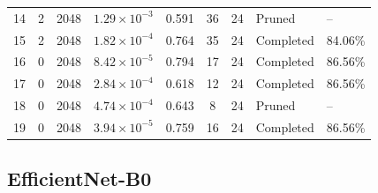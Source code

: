 {\begin{longtable}{lccccccll}
14 & 2 & 2048 & $1.29\times10^{-3}$ & 0.591 & 36 & 24 & Pruned & -- \\
15 & 2 & 2048 & $1.82\times10^{-4}$ & 0.764 & 35 & 24 & Completed & 84.06\% \\
\rowcolor{gray!15} 16 & 0 & 2048 & $8.42\times10^{-5}$ & 0.794 & 17 & 24 & Completed & 86.56\% \\
17 & 0 & 2048 & $2.84\times10^{-4}$ & 0.618 & 12 & 24 & Completed & 86.56\% \\
18 & 0 & 2048 & $4.74\times10^{-4}$ & 0.643 & 8 & 24 & Pruned & -- \\
19 & 0 & 2048 & $3.94\times10^{-5}$ & 0.759 & 16 & 24 & Completed & 86.56\% \\
\end{longtable}
}

\Needspace*{0.6\textheight}
\subsection{EfficientNet-B0}

